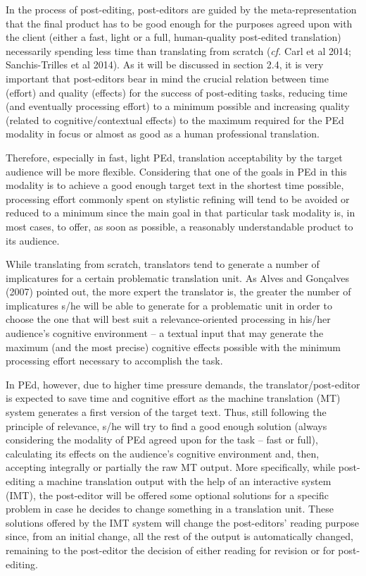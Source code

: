 \documentclass[output=paper]{langsci/langscibook}
\begin{document}
In the process of post-editing, post-editors are guided by the meta-representation that the final product  has to be good enough for the purposes agreed upon with the client (either a fast, light or a full, human-quality post-edited translation) necessarily spending less time than translating from scratch (\textit{cf. }Carl et al 2014; Sanchis-Trilles et al 2014). As it will be discussed in section 2.4, it is very important that post-editors bear in mind the crucial relation between time (effort) and quality (effects) for the success of post-editing tasks, reducing time (and eventually processing effort) to a minimum possible and increasing quality (related to cognitive/contextual effects) to the maximum required for the PEd modality in focus or almost as good as a human professional translation.



Therefore, especially in fast, light PEd, translation acceptability by the target audience will be more flexible. Considering that one of the goals in PEd in this modality is to achieve a good enough target text in the shortest time possible, processing effort commonly spent on stylistic refining will tend to be avoided or reduced to a minimum since the main goal in that particular task modality is, in most cases, to offer, as soon as possible, a reasonably understandable product to its audience. 



While translating from scratch, translators tend to generate a number of implicatures for a certain problematic translation unit. As Alves and Gonçalves (2007) pointed out, the more expert the translator is, the greater the number of implicatures s/he will be able to generate for a problematic unit in order to choose the one that will best suit a relevance-oriented processing in his/her audience’s cognitive environment – a textual input that may generate the maximum (and the most precise) cognitive effects possible with the minimum processing effort necessary to accomplish the task. 



In PEd, however, due to higher time pressure demands, the translator/post-editor is expected to save time and cognitive effort as the machine translation (MT) system generates a first version of the target text. Thus, still following the principle of relevance, s/he will try to find a good enough solution (always considering the modality of PEd agreed upon for the task – fast or full), calculating its effects on the audience’s cognitive environment and, then, accepting integrally or partially the raw MT output. More specifically, while post-editing a machine translation output with the help of an interactive system (IMT), the post-editor will be offered some optional solutions for a specific problem in case he decides to change something in a translation unit. These solutions offered by the IMT system will change the post-editors’ reading purpose since, from an initial change, all the rest of the output is automatically changed, remaining to the post-editor the decision of either reading for revision or  for post-editing. 
\end{document}

